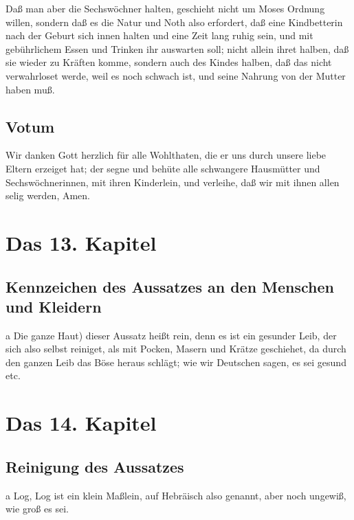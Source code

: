 Daß man aber die Sechswöchner halten, geschieht nicht um Moses Ordnung willen, sondern daß es die Natur und Noth also erfordert, daß eine Kindbetterin nach der Geburt sich innen halten und eine Zeit lang ruhig sein, und mit gebührlichem Essen und Trinken ihr auswarten soll; nicht allein ihret halben, daß sie wieder zu Kräften komme, sondern auch des Kindes halben, daß das nicht verwahrloset werde, weil es noch schwach ist, und seine Nahrung von der Mutter haben muß.

\section{Votum}

Wir danken Gott herzlich für alle Wohlthaten, die er uns durch unsere liebe Eltern erzeiget hat; der segne und behüte alle schwangere Hausmütter und Sechswöchnerinnen, mit ihren Kinderlein, und verleihe, daß wir mit ihnen allen selig werden, Amen.

\chapter{Das 13. Kapitel}

\section{Kennzeichen des Aussatzes an den Menschen und Kleidern}

a Die ganze Haut) dieser Aussatz heißt rein, denn es ist ein gesunder Leib, der sich also selbst reiniget, als mit Pocken, Masern und Krätze geschiehet, da durch den ganzen Leib das Böse heraus schlägt; wie wir Deutschen sagen, es sei gesund etc.

\chapter{Das 14. Kapitel}

\section{Reinigung des Aussatzes}

a Log, Log ist ein klein Maßlein, auf Hebräisch also genannt, aber noch ungewiß, wie groß es sei.

